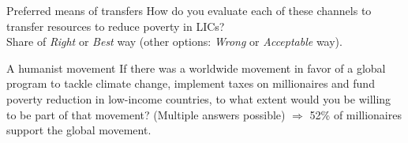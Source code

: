 \documentclass[aspectratio=169,xcolor=dvipsnames, 11pt,mathserif]{beamer}
\begin{document}
\begin{frame}{Preferred means of transfers}
    \vspace*{.5cm}
\centering How do you evaluate each of these channels to transfer resources to reduce poverty in LICs?\\ Share of \textit{Right} or \textit{Best} way (other options: \textit{Wrong} or \textit{Acceptable} way).
\end{frame}


\begin{frame}{A humanist movement}
\centering If there was a worldwide movement in favor of a global program to tackle climate change, implement taxes on millionaires and fund poverty reduction in low-income countries, to what extent would you be willing to be part of that movement? (Multiple answers possible)
$\Rightarrow$ 52\% of millionaires support the global movement.
\end{frame}
\end{document}
